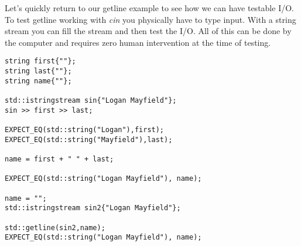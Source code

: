 \documentclass[]{tufte-handout}
\begin{document}
Let's quickly return to our getline example to see how we can have testable I/O.  To test getline working with \textit{cin} you physically have to type input. With a string stream you can fill the stream and then test the I/O. All of this can be done by the computer and requires zero human intervention at the time of testing.
\begin{verbatim}
string first{""};
string last{""};
string name{""};

std::istringstream sin{"Logan Mayfield"};
sin >> first >> last;

EXPECT_EQ(std::string("Logan"),first);
EXPECT_EQ(std::string("Mayfield"),last);
    
name = first + " " + last;

EXPECT_EQ(std::string("Logan Mayfield"), name);

name = "";
std::istringstream sin2{"Logan Mayfield"};

std::getline(sin2,name);
EXPECT_EQ(std::string("Logan Mayfield"), name);
\end{verbatim}
\end{document}
